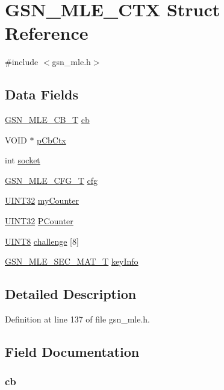 \hypertarget{a00151}{
\section{GSN\_\-MLE\_\-CTX Struct Reference}
\label{a00151}
}


{\ttfamily \#include $<$gsn\_\-mle.h$>$}

\subsection*{Data Fields}
\begin{DoxyCompactItemize}
\item 
\hyperlink{a00527_ab913f34ba94e3fffc3ebcc67f2df5c3e}{GSN\_\-MLE\_\-CB\_\-T} \hyperlink{a00151_ae08a4d309860fd41f9cfde966842a53f}{cb}
\item 
VOID $\ast$ \hyperlink{a00151_a040e2d4627baec5f0f81086400c1b66a}{pCbCtx}
\item 
int \hyperlink{a00151_a3666576f6b88007cc7b8f26c7da596c8}{socket}
\item 
\hyperlink{a00150}{GSN\_\-MLE\_\-CFG\_\-T} \hyperlink{a00151_a81fc5c006f1e1f6bfd4a7a206ba6e610}{cfg}
\item 
\hyperlink{a00660_gae1e6edbbc26d6fbc71a90190d0266018}{UINT32} \hyperlink{a00151_ad89adacdba574e0d7930140bfe96663f}{myCounter}
\item 
\hyperlink{a00660_gae1e6edbbc26d6fbc71a90190d0266018}{UINT32} \hyperlink{a00151_afc197474be8f5aa37a053d6bbc27f28d}{PCounter}
\item 
\hyperlink{a00660_gab27e9918b538ce9d8ca692479b375b6a}{UINT8} \hyperlink{a00151_ac937b0da946c4120665c2ba4bcbaf5a9}{challenge} \mbox{[}8\mbox{]}
\item 
\hyperlink{a00153}{GSN\_\-MLE\_\-SEC\_\-MAT\_\-T} \hyperlink{a00151_a55a650fe64ce13e9dcc109ab137aabdf}{keyInfo}
\end{DoxyCompactItemize}


\subsection{Detailed Description}


Definition at line 137 of file gsn\_\-mle.h.



\subsection{Field Documentation}
\hypertarget{a00151_ae08a4d309860fd41f9cfde966842a53f}{
\subsubsection[{cb}]{ {\bf cb}}}
\label{a00151_ae08a4d309860fd41f9cfde966842a53f}


